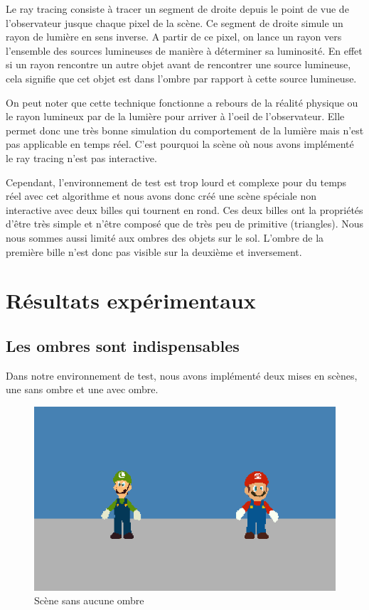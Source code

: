 \documentclass[a4paper,12pt]{report}
\begin{document}
Le ray tracing consiste à tracer un segment de droite depuis le point de vue de l'observateur jusque chaque pixel de la scène. Ce segment de droite simule un rayon de lumière en sens inverse. A partir de ce pixel, on lance un rayon vers l'ensemble des sources lumineuses de manière à déterminer sa luminosité. En effet si un rayon rencontre un autre objet avant de rencontrer une source lumineuse, cela signifie que cet objet est dans l'ombre par rapport à cette source lumineuse.

On peut noter que cette technique fonctionne a rebours de la réalité physique ou le rayon lumineux par de la lumière pour arriver à l'oeil de l'observateur. Elle permet donc une très bonne simulation du comportement de la lumière mais n'est pas applicable en temps réel. C'est pourquoi la scène où nous avons implémenté le ray tracing n'est pas interactive.

Cependant, l'environnement de test est trop lourd et complexe pour du temps réel avec cet algorithme et nous avons donc créé une scène spéciale non interactive avec deux billes qui tournent en rond. Ces deux billes ont la propriétés d'\^etre très simple et n'\^etre composé que de très peu de primitive (triangles).
Nous nous sommes aussi limité aux ombres des objets sur le sol. L'ombre de la première bille n'est donc pas visible sur la deuxième et inversement.


\chapter{Résultats expérimentaux}

\section{Les ombres sont indispensables}

Dans notre environnement de test, nous avons implémenté deux mises en scènes, une sans ombre et une avec ombre.

\begin{figure}[H]
\includegraphics[scale=0.5]{images/pasombre.png}
\centering
\caption{Scène sans aucune ombre}
\end{figure}
\end{document}
